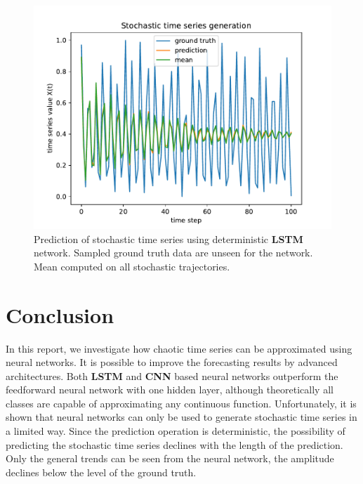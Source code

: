 \documentclass{article}
\begin{document}
\begin{figure}
  \centering
  \includegraphics[width=\textwidth]{figures/nn_limitation.pdf}
  \caption{Prediction of stochastic time series using deterministic 
  \textbf{LSTM} network. Sampled ground truth data are unseen for the network.
  Mean computed on all stochastic trajectories.}
  \label{fig:nn_limitation}
\end{figure}

\section{Conclusion}

In this report, we investigate how chaotic time series can be approximated
using neural networks. It is possible to improve the forecasting results by 
advanced architectures. Both \textbf{LSTM} and \textbf{CNN} based neural
networks outperform the feedforward neural network with one hidden layer,
although theoretically all classes are capable of approximating any continuous
function. Unfortunately, it is shown that neural networks can only be used to
generate stochastic time series in a limited way. Since the prediction operation
is deterministic, the possibility of predicting the stochastic time series
declines with the length of the prediction. Only the general trends can be seen
from the neural network, the amplitude declines below the level of the 
ground truth.



\end{document}
